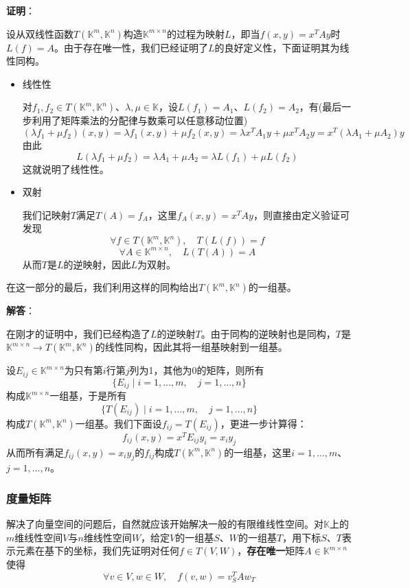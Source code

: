 \documentclass[a4paper,UTF8,fontset=windows,AutoFakeBold]{ctexart}
\newcommand{\proo}[1]{{\vspace{5pt}\kaishu\noindent\textbf{证明}：\vspace{-3pt}
\begin{compactitem}
    \item[] #1
\end{compactitem}
}}
\newcommand{\sol}[1]{{\vspace{5pt}\kaishu\noindent\textbf{解答}：\vspace{-3pt}
\begin{compactitem}
    \item[] #1
\end{compactitem}
}}
\begin{document}
\proo{
    设从双线性函数$T(\mathbb{K}^m,\mathbb{K}^n)$构造$\mathbb{K}^{m\times n}$的过程为映射$L$，即当$f(x,y)=x^TAy$时$L(f)=A$。由于存在唯一性，我们已经证明了$L$的良好定义性，下面证明其为线性同构。

    \begin{itemize}
        \item 线性性
        
        对$f_1,f_2\in T(\mathbb{K}^m,\mathbb{K}^n)$、$\lambda,\mu\in\mathbb{K}$，设$L(f_1)=A_1$、$L(f_2)=A_2$，有(最后一步利用了矩阵乘法的分配律与数乘可以任意移动位置)
        $$(\lambda f_1+\mu f_2)(x,y)=\lambda f_1(x,y)+\mu f_2(x,y)=\lambda x^TA_1y+\mu x^TA_2y=x^T(\lambda A_1+\mu A_2)y$$
        由此
        $$L(\lambda f_1+\mu f_2)=\lambda A_1+\mu A_2=\lambda L(f_1)+\mu L(f_2)$$
        这就说明了线性性。
        
        \item 双射

        我们记映射$T$满足$T(A)=f_A$，这里$f_A(x,y)=x^TAy$，则直接由定义验证可发现     
        $$\forall f\in T(\mathbb{K}^m,\mathbb{K}^n),\quad T(L(f))=f$$
        $$\forall A\in\mathbb{K}^{m\times n},\quad L(T(A))=A$$
        从而$T$是$L$的逆映射，因此$L$为双射。
    \end{itemize}
    
}

在这一部分的最后，我们利用这样的同构给出$T(\mathbb{K}^m,\mathbb{K}^n)$的一组基。

\sol{
    在刚才的证明中，我们已经构造了$L$的逆映射$T$。由于同构的逆映射也是同构，$T$是$\mathbb{K}^{m\times n}\to T(\mathbb{K}^m,\mathbb{K}^n)$的线性同构，因此其将一组基映射到一组基。

    设$E_{ij}\in\mathbb{K}^{m\times n}$为只有第$i$行第$j$列为1，其他为0的矩阵，则所有
    $$\{E_{ij}\mid i=1,\dots,m,\quad j=1,\dots,n\}$$
    构成$\mathbb{K}^{m\times n}$一组基，于是所有
    $$\{T(E_{ij})\mid i=1,\dots,m,\quad j=1,\dots,n\}$$
    构成$T(\mathbb{K}^m,\mathbb{K}^n)$一组基。我们下面设$f_{ij}=T(E_{ij})$，更进一步计算得：
    $$f_{ij}(x,y)=x^TE_{ij}y_i=x_iy_j$$
    从而所有满足$f_{ij}(x,y)=x_iy_j$的$f_{ij}$构成$T(\mathbb{K}^m,\mathbb{K}^n)$的一组基，这里$i=1,\dots,m$、$j=1,\dots,n$。
}

\subsubsection{度量矩阵}
解决了向量空间的问题后，自然就应该开始解决一般的有限维线性空间。对$\mathbb{K}$上的$m$维线性空间$V$与$n$维线性空间$W$，给定$V$的一组基$S$、$W$的一组基$T$，用下标$S$、$T$表示元素在基下的坐标，我们先证明对任何$f\in T(V,W)$，\textbf{存在唯一}矩阵$A\in\mathbb{K}^{m\times n}$使得
$$\forall v\in V,w\in W,\quad f(v,w)=v_S^TAw_T$$
\end{document}
